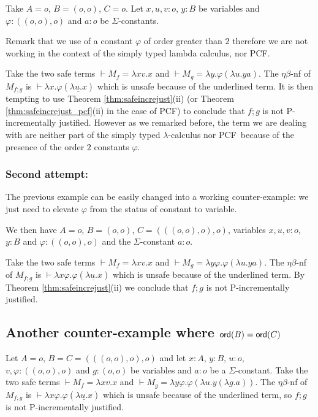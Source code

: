 \documentclass{article}
\newcommand\pcf{\textsf{PCF}}
\newcommand{\ord}[1]{{\sf ord}(#1)}
\theoremstyle{remark}
\theoremstyle{definition}
\begin{document}
Take $A=o$, $B=(o,o)$, $C=o$. Let $x,u,v:o$, $y:B$ be variables and $\varphi:((o,o),o)$ and $a:o$ be $\Sigma$-constants.

Remark that we use of a constant $\varphi$ of order greater than $2$ therefore we are not working in the context of the simply typed lambda calculus, nor \pcf.

Take the two safe terms $\vdash  M_f = \lambda xv.x$ and $\vdash M_g = \lambda y . \varphi (\lambda u . y a)$.
The $\eta\beta$-nf of $M_{f;g}$ is
$\vdash \lambda x . \varphi (\underline{\lambda u . x})$ which is unsafe
because of the underlined term. It is then tempting to use
Theorem \ref{thm:safeincrejust}(ii) (or Theorem \ref{thm:safeincrejust_pcf}(ii) in the case of \pcf) to conclude that
$f;g$ is not P-incrementally justified. However as we remarked before,
the term we are dealing with are neither part of the
simply typed $\lambda$-calculus nor \pcf\ because of the presence of the
order $2$ constants $\varphi$.

\subsubsection{Second attempt:}
The previous example can be easily changed into a working counter-example: we just need to elevate $\varphi$ from the status of constant to variable.

We then have $A=o$, $B=(o,o)$, $C=(((o,o),o),o)$, variables
$x,u,v:o$, $y:B$
and $\varphi:((o,o),o)$ and the $\Sigma$-constant $a:o$.

Take the two safe terms $\vdash  M_f = \lambda xv.x$ and
 $\vdash M_g = \lambda y \varphi. \varphi (\lambda u . y a)$.
The $\eta\beta$-nf of $M_{f;g}$ is
$\vdash \lambda x \varphi. \varphi (\underline{\lambda u . x})$ which is unsafe because of the underlined term. By
Theorem \ref{thm:safeincrejust}(ii) we conclude that
$f;g$ is not P-incrementally justified.

\subsection{Another counter-example where $\ord{B} = \ord{C}$}

Let $A=o$, $B=C=(((o,o),o),o)$ and
let $x:A$, $y:B$, $u:o$, $v,\varphi:((o,o),o)$
and $g:(o,o)$ be variables
and  $a:o$ be a $\Sigma$-constant. Take the two safe terms $\vdash  M_f = \lambda x v.x$ and $\vdash M_g = \lambda y \varphi. \varphi (\lambda u . y (\lambda g. a))$.
The $\eta\beta$-nf of $M_{f;g}$ is
$\vdash \lambda x \varphi. \varphi (\underline{\lambda u . x})$
which is unsafe because of the underlined term, so
$f;g$ is not P-incrementally justified.




\end{document}
